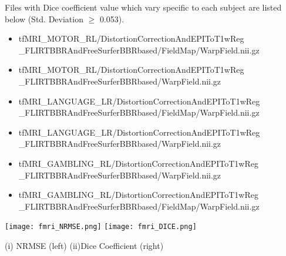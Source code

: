 Files with Dice coefficient value which vary specific to each subject are listed below (Std. Deviation $\geq$ 0.053).
\begin{itemize}
  \item {tfMRI\_MOTOR\_RL/DistortionCorrectionAndEPIToT1wReg
          \_FLIRTBBRAndFreeSurferBBRbased/FieldMap/WarpField.nii.gz}
  \item {tfMRI\_MOTOR\_RL/DistortionCorrectionAndEPIToT1wReg
          \_FLIRTBBRAndFreeSurferBBRbased/WarpField.nii.gz}
  \item {tfMRI\_LANGUAGE\_LR/DistortionCorrectionAndEPIToT1wReg
          \_FLIRTBBRAndFreeSurferBBRbased/FieldMap/WarpField.nii.gz}
  \item {tfMRI\_LANGUAGE\_LR/DistortionCorrectionAndEPIToT1wReg
          \_FLIRTBBRAndFreeSurferBBRbased/WarpField.nii.gz}
  \item {tfMRI\_GAMBLING\_RL/DistortionCorrectionAndEPIToT1wReg
          \_FLIRTBBRAndFreeSurferBBRbased/WarpField.nii.gz}
  \item {tfMRI\_GAMBLING\_RL/DistortionCorrectionAndEPIToT1wReg
          \_FLIRTBBRAndFreeSurferBBRbased/FieldMap/WarpField.nii.gz}
\end{itemize}

\begin{center}
\texttt{[image: fmri\_NRMSE.png]}%
\texttt{[image: fmri\_DICE.png]}
\caption*{(i) NRMSE (left) (ii)Dice Coefficient (right)}
\label{fig:fMRI_metric_values}
\end{center}
